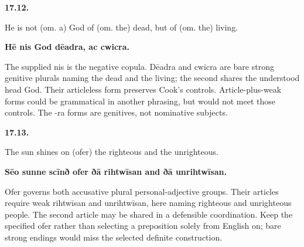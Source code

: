 \par\begin{minipage}{\linewidth}\raggedright
\textbf{17.12.}

He is not (om. a) God of (om. the) dead, but of (om. the) living.

\textbf{Hē nis God dēadra, ac cwicra.}

The supplied nis is the negative copula. Dēadra and cwicra are bare strong genitive plurals naming the dead and the living; the second shares the understood head God. Their articleless form preserves Cook's controls. Article-plus-weak forms could be grammatical in another phrasing, but would not meet those controls. The -ra forms are genitives, not nominative subjects.

\end{minipage}\par\addvspace{4pt}

\par\begin{minipage}{\linewidth}\raggedright
\textbf{17.13.}

The sun shines on (ofer) the righteous and the unrighteous.

\textbf{Sēo sunne scīnð ofer ðā rihtwīsan and ðā unrihtwīsan.}

Ofer governs both accusative plural personal-adjective groups. Their articles require weak rihtwīsan and unrihtwīsan, here naming righteous and unrighteous people. The second article may be shared in a defensible coordination. Keep the specified ofer rather than selecting a preposition solely from English on; bare strong endings would miss the selected definite construction.

\end{minipage}\par\addvspace{4pt}


